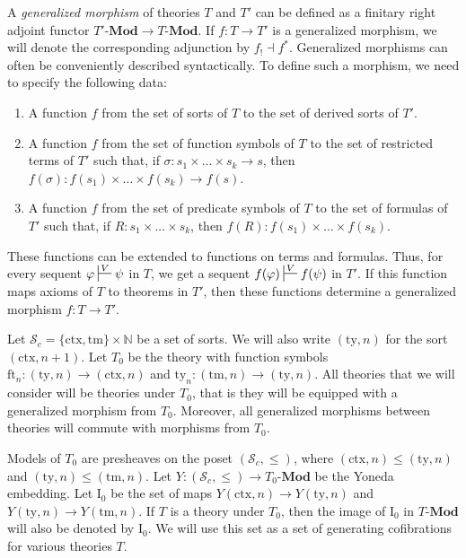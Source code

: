 \documentclass[reqno]{amsart}
\theoremstyle{definition}
\theoremstyle{remark}
\newcommand{\fs}[1]{\mathrm{#1}}
\newcommand{\Mod}[1]{#1\text{-}\mathbf{Mod}}
\newcommand{\I}{\fs{I}}
\numberwithin{figure}{section}
\begin{document}
A \emph{generalized morphism} of theories $T$ and $T'$ can be defined as a finitary right adjoint functor $\Mod{T'} \to \Mod{T}$.
If $f : T \to T'$ is a generalized morphism, we will denote the corresponding adjunction by $f_! \dashv f^*$.
Generalized morphisms can often be conveniently described syntactically.
To define such a morphism, we need to specify the following data:
\begin{enumerate}
\item A function $f$ from the set of sorts of $T$ to the set of derived sorts of $T'$.
\item A function $f$ from the set of function symbols of $T$ to the set of restricted terms of $T'$ such that, if $\sigma : s_1 \times \ldots \times s_k \to s$, then $f(\sigma) : f(s_1) \times \ldots \times f(s_k) \to f(s)$.
\item A function $f$ from the set of predicate symbols of $T$ to the set of formulas of $T'$ such that, if $R : s_1 \times \ldots \times s_k$, then $f(R) : f(s_1) \times \ldots \times f(s_k)$.
\end{enumerate}
These functions can be extended to functions on terms and formulas.
Thus, for every sequent $\varphi \sststile{}{V} \psi$ in $T$, we get a sequent $f(\varphi) \sststile{}{V} f(\psi)$ in $T'$.
If this function maps axioms of $T$ to theorems in $T'$, then these functions determine a generalized morphism $f : T \to T'$.

Let $\mathcal{S}_c = \{ \fs{ctx}, \fs{tm} \} \times \mathbb{N}$ be a set of sorts.
We will also write $(\fs{ty},n)$ for the sort $(\fs{ctx},n+1)$.
Let $T_0$ be the theory with function symbols $\fs{ft}_n : (\fs{ty},n) \to (\fs{ctx},n)$ and $\fs{ty}_n : (\fs{tm},n) \to (\fs{ty},n)$.
All theories that we will consider will be theories under $T_0$, that is they will be equipped with a generalized morphism from $T_0$.
Moreover, all generalized morphisms between theories will commute with morphisms from $T_0$.

Models of $T_0$ are presheaves on the poset $(\mathcal{S}_c,\leq)$, where $(\fs{ctx},n) \leq (\fs{ty},n)$ and $(\fs{ty},n) \leq (\fs{tm},n)$.
Let $Y : (\mathcal{S}_c,\leq) \to \Mod{T_0}$ be the Yoneda embedding.
Let $\I_0$ be the set of maps $Y(\fs{ctx},n) \to Y(\fs{ty},n)$ and $Y(\fs{ty},n) \to Y(\fs{tm},n)$.
If $T$ is a theory under $T_0$, then the image of $\I_0$ in $\Mod{T}$ will also be denoted by $\I_0$.
We will use this set as a set of generating cofibrations for various theories $T$.
\end{document}
